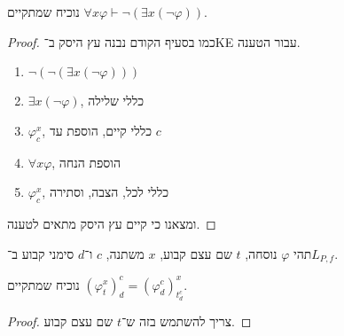 \subquestion{}
נוכיח שמתקיים $\forall x \varphi \vdash \lnot (\exists x (\lnot \varphi))$.
\begin{proof}
	כמו בסעיף הקודם נבנה עץ היסק ב־KE עבור הטענה.
	\begin{enumerate}
		\item $\lnot (\lnot (\exists x (\lnot \varphi)))$
		\item $\exists x (\lnot \varphi)$, כללי שלילה
		\item $\varphi_c^x$, כללי קיים, הוספת עד $c$
		\item $\forall x \varphi$, הוספת הנחה
		\item $\varphi_c^x$, כללי לכל, הצבה, וסתירה
	\end{enumerate}
	ומצאנו כי קיים עץ היסק מתאים לטענה.
\end{proof}

\question{}
תהי $\varphi$ נוסחה, $t$ שם עצם קבוע, $x$ משתנה, $c$ ו־$d$ סימני קבוע ב־$L_{P, f}$.

\subquestion{}
נוכיח שמתקיים ${(\varphi_t^x)}_d^c = {(\varphi_d^c)}_{t_d^c}^x$.
\begin{proof}
	צריך להשתמש בזה ש־$t$ שם עצם קבוע.
\end{proof}


